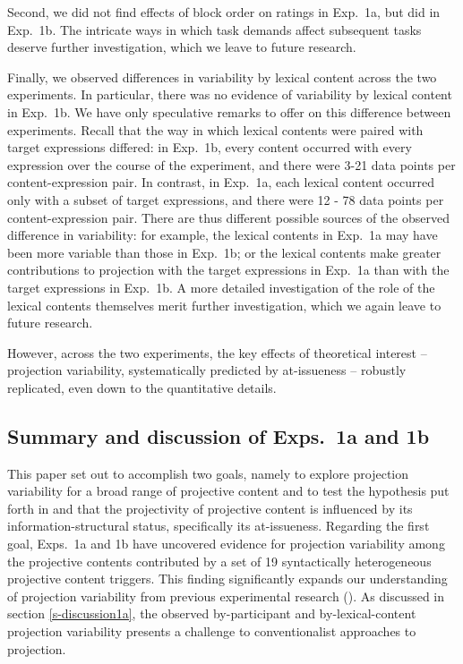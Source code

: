 \documentclass[11pt,fleqn]{article}
\newcommand{\6}{\mbox{$[\hspace*{-.6mm}[$}}
\newcommand{\9}{\mbox{$]\hspace*{-.6mm}]$}}
\begin{document}
Second, we did not find effects of block order on ratings in Exp.~1a, but did in Exp.~1b. The intricate ways in which task demands affect subsequent tasks deserve further investigation, which we leave to future research.

Finally, we observed differences in variability by lexical content across the two experiments. In particular, there was no evidence of variability by lexical content in Exp.~1b. We have only speculative remarks to offer on this difference between experiments. Recall that the way in which lexical contents were paired with target expressions differed: in Exp.~1b, every content occurred with every expression over the course of the experiment, and there were 3-21 data points per content-expression pair. In contrast, in Exp.~1a, each lexical content occurred only with a subset of target expressions, and there were 12 - 78 data points per content-expression pair. There are thus different possible sources of the observed difference in variability: for example, the lexical contents in Exp.~1a may have been more variable than those in Exp.~1b; or the lexical contents make greater contributions to projection with the target expressions in Exp.~1a than with the target expressions in Exp.~1b. A more detailed investigation of the role of the lexical contents themselves merit further investigation, which we again leave to future research.

However, across the two experiments, the key effects of theoretical interest -- projection variability, systematically predicted by at-issueness -- robustly replicated, even down to the quantitative details.

\subsection{Summary and discussion of Exps.~1a and 1b}


This paper set out to accomplish two goals, namely to explore projection variability for a broad range of projective content and to test the hypothesis put forth in \citealt{brst-salt10} and \citealt{brst-ar} that the projectivity of projective content is influenced by its information-structural status, specifically its at-issueness. Regarding the first goal, Exps.~1a and 1b have uncovered evidence for projection variability among the projective contents contributed by a set of 19 syntactically heterogeneous projective content triggers. This finding significantly expands our understanding of projection variability from previous experimental research (\citealt{xue-onea11,smith-hall11}). As discussed in section \ref{s-discussion1a}, the observed by-participant and by-lexical-content projection variability presents a challenge to conventionalist approaches to projection. 
\end{document}
